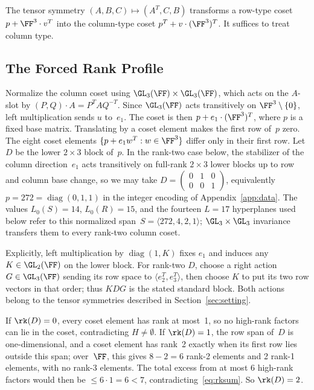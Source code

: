 \documentclass[11pt,a4paper]{article}
\begin{document}
The tensor symmetry $(A,B,C)\mapsto(A^T,C,B)$ transforms a row-type coset $p+\FF^3\cdot v^T$ into the column-type coset $p^T+v\cdot(\FF^3)^T$.  It suffices to treat column type.

\subsection{The Forced Rank Profile}

Normalize the column coset using $\GL_3(\FF)\times\GL_3(\FF)$, which acts on the $A$-slot by $(P,Q)\cdot A = P^TAQ^{-T}$.  Since $\GL_3(\FF)$ acts transitively on $\FF^3\setminus\{0\}$, left multiplication sends $u$ to~$e_1$.  The coset is then $p+e_1\cdot(\FF^3)^T$, where $p$ is a fixed base matrix.  Translating by a coset element makes the first row of~$p$ zero.  The eight coset elements $\{p+e_1w^T:w\in\FF^3\}$ differ only in their first row.  Let $D$ be the lower $2\times 3$ block of~$p$.  In the rank-two case below, the stabilizer of the column direction~$e_1$ acts transitively on full-rank $2\times3$ lower blocks up to row and column base change, so we may take $D=\left(\begin{smallmatrix}0&1&0\\0&0&1\end{smallmatrix}\right)$, equivalently $p=272=\operatorname{diag}(0,1,1)$ in the integer encoding of Appendix~\ref{app:data}.  The values $L_0(S)=14$, $L_0(R)=15$, and the fourteen $L=17$ hyperplanes used below refer to this normalized span~$S=\langle272,4,2,1\rangle$; $\GL_3\times\GL_3$ invariance transfers them to every rank-two column coset.

Explicitly, left multiplication by $\operatorname{diag}(1,K)$ fixes
$e_1$ and induces any $K\in\GL_2(\FF)$ on the lower block.
For rank-two $D$, choose a right action $G\in\GL_3(\FF)$ sending its
row space to $\langle e_2^T,e_3^T\rangle$, then choose $K$ to put its
two row vectors in that order; thus $KDG$ is the stated standard block.
Both actions belong to the tensor symmetries described in
Section~\ref{sec:setting}.

If $\rk(D)=0$, every coset element has rank at most~1, so no high-rank factors can lie in the coset, contradicting $H\ne\emptyset$.  If $\rk(D)=1$, the row span of~$D$ is one-dimensional, and a coset element has rank~2 exactly when its first row lies outside this span; over~$\FF$, this gives $8-2=6$ rank-2 elements and 2 rank-1 elements, with no rank-3 elements.  The total excess from at most 6 high-rank factors would then be $\le 6\cdot 1=6<7$, contradicting~\eqref{eq:rksum}.  So $\rk(D)=2$.
\end{document}

